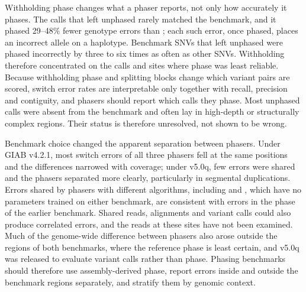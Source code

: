 Withholding phase changes what a phaser reports, not only how accurately it phases. The calls that \toolname left unphased rarely matched the benchmark, and it phased 29--48\% fewer genotype errors than \whatshap; each such error, once phased, places an incorrect allele on a haplotype. Benchmark SNVs that \toolname left unphased were phased incorrectly by \whatshap three to six times as often as other SNVs. Withholding therefore concentrated on the calls and sites where phase was least reliable. Because withholding phase and splitting blocks change which variant pairs are scored, switch error rates are interpretable only together with recall, precision and contiguity, and phasers should report which calls they phase. Most unphased calls were absent from the benchmark and often lay in high-depth or structurally complex regions. Their status is therefore unresolved, not shown to be wrong.

Benchmark choice changed the apparent separation between phasers. Under GIAB v4.2.1, most switch errors of all three phasers fell at the same positions and the differences narrowed with coverage; under v5.0q, few errors were shared and the phasers separated more clearly, particularly in segmental duplications. Errors shared by phasers with different algorithms, including \whatshap and \hapcut, which have no parameters trained on either benchmark, are consistent with errors in the phase of the earlier benchmark. Shared reads, alignments and variant calls could also produce correlated errors, and the reads at these sites have not been examined. Much of the genome-wide difference between phasers also arose outside the regions of both benchmarks, where the reference phase is least certain, and v5.0q was released to evaluate variant calls rather than phase\cite{olson2026giabv5}. Phasing benchmarks should therefore use assembly-derived phase, report errors inside and outside the benchmark regions separately, and stratify them by genomic context\cite{dwarshuis2024stratifications}.

